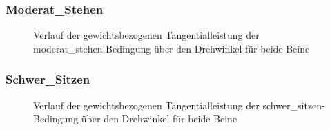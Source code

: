\documentclass[
  letterpaper,
  DIV=11]{scrartcl}
\begin{document}
\subsubsection{Moderat\_Stehen}

\begin{figure}


\caption{\label{fig-Tangentialleistung_Moderat_Stehen}Verlauf der
gewichtsbezogenen Tangentialleistung der moderat\_stehen-Bedingung über
den Drehwinkel für beide Beine}

\end{figure}%

\subsubsection{Schwer\_Sitzen}

\begin{figure}


\caption{\label{fig-Tangentialleistung_Schwer_Sitzen}Verlauf der
gewichtsbezogenen Tangentialleistung der schwer\_sitzen-Bedingung über
den Drehwinkel für beide Beine}

\end{figure}%
\end{document}
